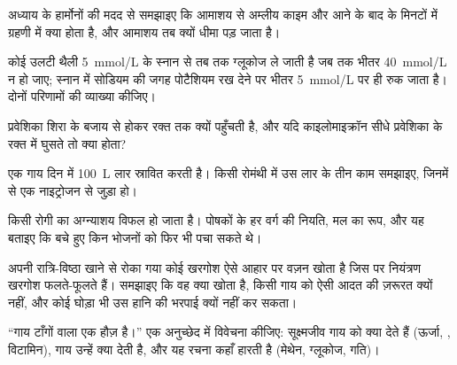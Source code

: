 \begin{exercise}[$\star\star$]\label{exo:b1:digestion-absorption:6}
अध्याय के हार्मोनों की मदद से समझाइए कि आमाशय से अम्लीय काइम और  आने
के बाद के मिनटों में ग्रहणी में क्या होता है, और आमाशय तब क्यों धीमा
पड़ जाता है।
\end{exercise}

\begin{exercise}[$\star\star$]\label{exo:b1:digestion-absorption:7}
कोई उलटी थैली \qty{5}{mmol/L} के स्नान से तब तक ग्लूकोज ले जाती है जब तक
भीतर \qty{40}{mmol/L} न हो जाए; स्नान में सोडियम की जगह पोटैशियम रख देने
पर भीतर \qty{5}{mmol/L} पर ही रुक जाता है। दोनों परिणामों की व्याख्या
कीजिए।
\end{exercise}

\begin{exercise}[$\star\star$]\label{exo:b1:digestion-absorption:8}
 प्रवेशिका शिरा के बजाय  से होकर रक्त तक क्यों पहुँचती है, और
यदि काइलोमाइक्रॉन सीधे प्रवेशिका के रक्त में घुसते तो क्या होता?
\end{exercise}

\begin{exercise}[$\star\star$]\label{exo:b1:digestion-absorption:9}
एक गाय दिन में \qty{100}{L} लार स्रावित करती है। किसी रोमंथी में उस लार
के तीन काम समझाइए, जिनमें से एक नाइट्रोजन से जुड़ा हो।
\end{exercise}

\begin{exercise}[$\star\star\star$]\label{exo:b1:digestion-absorption:10}
किसी रोगी का अग्न्याशय विफल हो जाता है। पोषकों के हर वर्ग की नियति, मल
का रूप, और यह बताइए कि बचे हुए  किन भोजनों को फिर भी पचा सकते
थे।
\end{exercise}

\begin{exercise}[$\star\star\star$]\label{exo:b1:digestion-absorption:11}
अपनी रात्रि-विष्ठा खाने से रोका गया कोई खरगोश ऐसे आहार पर वज़न खोता है
जिस पर नियंत्रण खरगोश फलते-फूलते हैं। समझाइए कि वह क्या खोता है, किसी
गाय को ऐसी आदत की ज़रूरत क्यों नहीं, और कोई घोड़ा भी उस हानि की भरपाई
क्यों नहीं कर सकता।
\end{exercise}

\begin{exercise}[$\star\star\star$]\label{exo:b1:digestion-absorption:12}
``गाय टाँगों वाला एक  हौज़ है।'' एक अनुच्छेद में विवेचना कीजिए:
सूक्ष्मजीव गाय को क्या देते हैं (ऊर्जा, , विटामिन), गाय उन्हें
क्या देती है, और यह रचना कहाँ हारती है (मेथेन, ग्लूकोज, गति)।
\end{exercise}


